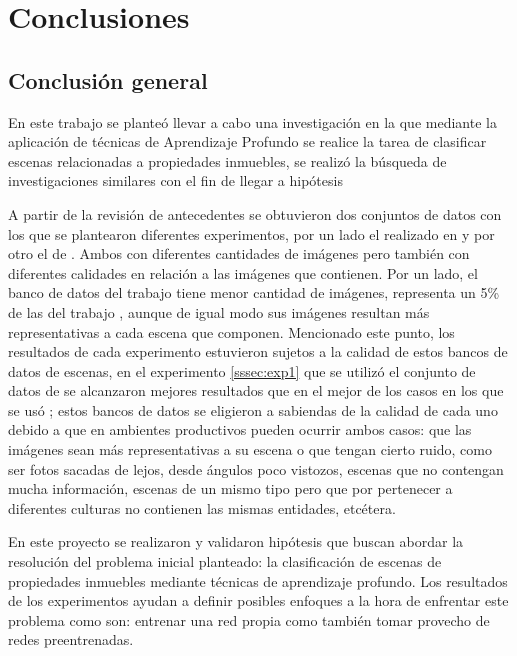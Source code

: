 \section{Conclusiones}

\subsection{Conclusión general}
En este trabajo se planteó llevar a cabo una investigación en la que mediante la aplicación de técnicas de Aprendizaje Profundo se realice la tarea de clasificar escenas relacionadas a propiedades inmuebles, se realizó la búsqueda de investigaciones similares con el fin de llegar a hipótesis 

A partir de la revisión de antecedentes se obtuvieron dos conjuntos de datos con los que se plantearon diferentes experimentos, por un lado el realizado en \cite{vision_based_real_estate_price_estimation} y por otro el de \cite{lstm_real_estate}. Ambos con diferentes cantidades de imágenes pero también con diferentes calidades en relación a las imágenes que contienen. Por un lado, el banco de datos del trabajo \cite{lstm_real_estate} tiene menor cantidad de imágenes, representa un 5\% de las del trabajo \cite{vision_based_real_estate_price_estimation}, aunque de igual modo sus imágenes resultan más representativas a cada escena que componen. Mencionado este punto, los resultados de cada experimento estuvieron sujetos a la calidad de estos bancos de datos de escenas, en el experimento \ref{sssec:exp1} que se utilizó el conjunto de datos de \cite{lstm_real_estate} se alcanzaron mejores resultados que en el mejor de los casos en los que se usó \cite{vision_based_real_estate_price_estimation}; estos bancos de datos se eligieron a sabiendas de la calidad de cada uno debido a que en ambientes productivos pueden ocurrir ambos casos: que las imágenes sean más representativas a su escena o que tengan cierto ruido, como ser fotos sacadas de lejos, desde ángulos poco vistozos, escenas que no contengan mucha información, escenas de un mismo tipo pero que por pertenecer a diferentes culturas no contienen las mismas entidades, etcétera. 

En este proyecto se realizaron y validaron hipótesis que buscan abordar la resolución del problema inicial planteado: la clasificación de escenas de propiedades inmuebles mediante técnicas de aprendizaje profundo.
Los resultados de los experimentos ayudan a definir posibles enfoques a la hora de enfrentar este problema como son: entrenar una red propia como también tomar provecho de redes preentrenadas. 

